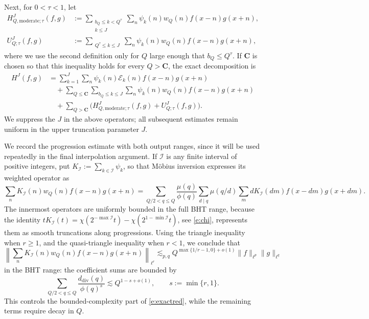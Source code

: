 \documentclass[12pt,leqno]{amsart}
\numberwithin{equation}{section}
\theoremstyle{definition}
\theoremstyle{plain}
\begin{document}
	Next, for $0<\tau<1$, let
	\begin{align*}
		H^J_{Q,\mathrm{moderate};\tau}(f,g)
		&:=\sum_{\substack{b_Q\leq k<Q^\tau\\k\leq J}}
		\sum_n\psi_k(n)w_Q(n)f(x-n)g(x+n),\\
		U^J_{Q;\tau}(f,g)
		&:=\sum_{\substack{Q^\tau\leq k\leq J}}
		\sum_n\psi_k(n)w_Q(n)f(x-n)g(x+n),
	\end{align*}
	where we use the second definition only for $Q$ large enough that
	$b_Q\leq Q^\tau$.
	If $\mathbf C$ is chosen so that this inequality holds for every
	$Q>\mathbf C$, the exact decomposition is
	\begin{equation}\label{e:exactred}
		\begin{split}
			H^J(f,g)
			&=\sum_{k=1}^J\sum_n\psi_k(n)\mathcal E_k(n)f(x-n)g(x+n)\\
			&\quad+\sum_{Q\leq\mathbf C}\sum_{b_Q\leq k\leq J}
			\sum_n\psi_k(n)w_Q(n)f(x-n)g(x+n)\\
			&\quad+\sum_{Q>\mathbf C}
			\big(H^J_{Q,\mathrm{moderate};\tau}(f,g)+U^J_{Q;\tau}(f,g)\big).
		\end{split}
	\end{equation}
	We suppress the $J$ in the above operators; all subsequent
	estimates remain uniform in the upper truncation parameter $J$. 
	
	We record the progression estimate with both output ranges, since it
	will be used repeatedly in the final interpolation argument.
	If $\mathcal I$ is any finite interval of positive integers, put
	$K_{\mathcal I}:=\sum_{k\in\mathcal I}\psi_k$, so that M\"obius inversion
	expresses its weighted operator as
	\[
	\sum_n K_{\mathcal I}(n)w_Q(n)f(x-n)g(x+n)
	=\sum_{Q/2<q\leq Q}\frac{\mu(q)}{\phi(q)}
	\sum_{d\mid q}\mu(q/d)
	\sum_m dK_{\mathcal I}(dm)f(x-dm)g(x+dm).
	\]
	The innermost operators are uniformly bounded in the full BHT range,
	because the identity
	$tK_{\mathcal I}(t)=\chi(2^{-\max\mathcal I}t)
	-\chi(2^{1-\min\mathcal I}t)$, see \eqref{e:chi},
	represents them as smooth truncations along progressions.
	Using the triangle inequality when $r\geq1$, and the quasi-triangle
	inequality when $r<1$, we conclude that
	\begin{equation}\label{e:progression}
		\left\|\sum_n K_{\mathcal I}(n)w_Q(n)f(x-n)g(x+n)\right\|_{\ell^r}
		\lesssim_{p,q}Q^{\max\{1/r-1,0\}+o(1)}
		\|f\|_{\ell^p}\|g\|_{\ell^q}
	\end{equation}
	in the BHT range: the coefficient sums are bounded by
	\[ \sum_{Q/2<q\leq Q} \frac{d_{\mathrm{div}}(q)}{\phi(q)^s}
	\lesssim Q^{1-s+o(1)}, \qquad s:=\min\{r,1\}.\]
	This controls the bounded-complexity part of \eqref{e:exactred}, while
	the remaining terms require decay in $Q$.
	
\end{document}
